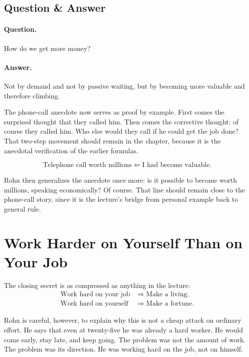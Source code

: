\subsection{Question \& Answer}

\paragraph{Question.} How do we get more money?

\paragraph{Answer.} Not by demand and not by passive waiting, but by becoming more valuable and therefore climbing.

The phone-call anecdote now serves as proof by example. First comes the surprised thought that they called him. Then comes the corrective thought: of course they called him. Who else would they call if he could get the job done? That two-step movement should remain in the chapter, because it is the anecdotal verification of the earlier formulas.

\begin{equation}
\text{Telephone call worth millions} \Longleftarrow \text{I had become valuable}.
\end{equation}

Rohn then generalizes the anecdote once more: is it possible to become worth millions, speaking economically? Of course. That line should remain close to the phone-call story, since it is the lecture's bridge from personal example back to general rule.

\section{Work Harder on Yourself Than on Your Job}

The closing secret is as compressed as anything in the lecture:
\begin{align}
\text{Work hard on your job} &\Longrightarrow \text{Make a living},\\
\text{Work hard on yourself} &\Longrightarrow \text{Make a fortune}.
\end{align}

Rohn is careful, however, to explain why this is not a cheap attack on ordinary effort. He says that even at twenty-five he was already a hard worker. He would come early, stay late, and keep going. The problem was not the amount of work. The problem was its direction. He was working hard on the job, not on himself.

